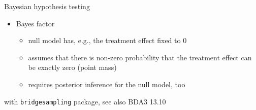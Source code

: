 \documentclass[english,t]{beamer}
\begin{document}
\begin{frame}{Bayesian hypothesis testing}

  \begin{itemize}
  \item Bayes factor
    \begin{itemize}
    \item null model has, e.g., the treatment effect fixed to 0
    \item assumes that there is non-zero probability that the
      treatment effect can be exactly zero (point mass)
    \item requires posterior inference for the null model, too
    \end{itemize}
  \end{itemize}
    \vspace{-1\baselineskip}
  
    \vspace{-1.2\baselineskip}
    
    {\footnotesize\color{gray}\hspace{1cm}  with {\tt bridgesampling} package, see also BDA3 13.10}
\end{frame}
\end{document}

